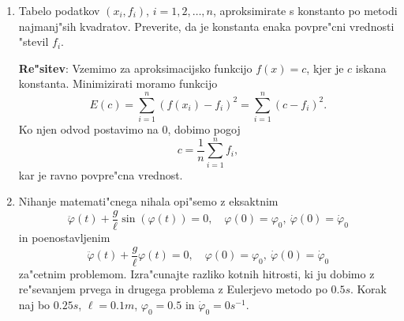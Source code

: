 \documentclass[12pt,a4paper]{article}
\begin{document}
\begin{enumerate}
    
    {\bf Re"sitev}: Konstanti $\alpha_1$ in $\alpha_2$ izra"cunamo tako, da
    za $f$ zaporedoma izberemo $1$ in $x$ ter zahtevamo, da je formula to"cna.
    Dobimo sistem
    \begin{align*}
    	\alpha_1+\alpha_2&=\arcsin{x}\vert_{-1}^1=\pi,\\
    	\alpha_1\frac{\sqrt{2}}{2}-\alpha_2\frac{\sqrt{2}}{2}&=0,
    \end{align*}
    katerega re"sitev je $\alpha_1=\alpha_2=\pi/2$.\\
    Numeri"cni pribli"zek za integral je torej
    $$\int_{-1}^{1}\frac{e^{x}}{\sqrt{1-x^2}}\,dx\approx
    \frac{\pi}{2}\left(e^{\frac{\sqrt{2}}{2}}+e^{-\frac{\sqrt{2}}{2}}\right)=
    3.9603.
    $$
    Iz Gauss--Chebysheve formule dobimo oceno za absolutno napako
    \begin{align*}
    	&\left|\int_{-1}^{1}\frac{e^{x}}{\sqrt{1-x^2}}\,dx-
        \sum_{k=1}^2 \alpha_k\,e^{\cos\left(\frac{2k-1}{4}\pi\right)}
       \right|\leq \frac{2\,\pi}{2^{4}(4)!}\max_{\xi\in[-1,1]}
       (e^{x})^{(4)}\\
       &<\frac{2\,\pi}{2^{4}(4)!}e^1=0.0445.
    \end{align*}
    
  \item Tabelo podatkov $(x_i,f_i)$, $i=1,2,\dots,n$, 
      aproksimirate s konstanto po metodi
      najmanj"sih kvadratov. Preverite, da je konstanta enaka povpre"cni vrednosti
      "stevil $f_i$.  
    
    {\bf Re"sitev}: Vzemimo za aproksimacijsko funkcijo $f(x)=c$, kjer
     je $c$ iskana konstanta.
     Minimizirati moramo funkcijo
     $$E(c)=\sum_{i=1}^n(f(x_i)-f_i)^2=
     \sum_{i=1}^n(c-f_i)^2.
     $$
     Ko njen odvod postavimo na $0$, dobimo pogoj
     $$c=\frac{1}{n}\sum_{i=1}^n f_i,$$ 
     kar je ravno povpre"cna vrednost.
    	
  
  \item 
    Nihanje matemati"cnega nihala opi"semo z eksaktnim  
    $$\ddot\varphi(t)+\frac{g}{\ell}\sin(\varphi(t))=0, \quad \varphi(0)=\varphi_0,\ 
      \dot\varphi(0)=\dot\varphi_0$$
    in poenostavljenim 
     $$\ddot\varphi(t)+\frac{g}{\ell}\varphi(t)=0, \quad \varphi(0)=\varphi_0,\ 
      \dot\varphi(0)=\dot\varphi_0$$
    za"cetnim problemom. 
    Izra"cunajte razliko kotnih hitrosti, ki ju dobimo z re"sevanjem prvega in drugega
    problema z Eulerjevo metodo po $0.5s$. Korak naj bo $0.25s$, $\ell=0.1m$,
    $\varphi_0=0.5$ in $\dot\varphi_0=0s^{-1}$.
    

\end{enumerate}
\end{document}
